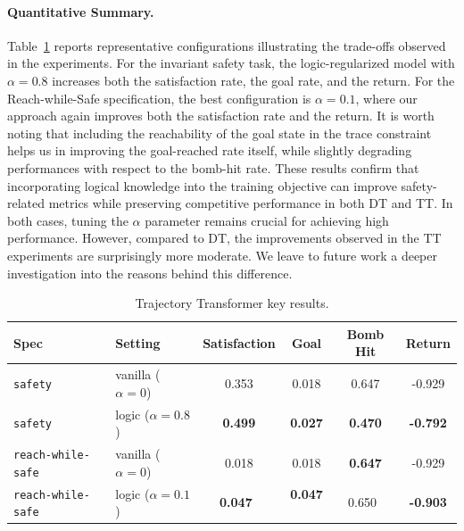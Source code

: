 \paragraph{Quantitative Summary.}
Table~\ref{tab:cb_key_results} reports representative configurations illustrating the trade-offs observed in the experiments.
For the invariant safety task, the logic-regularized model with $\alpha=0.8$ increases both the satisfaction rate, the goal rate, and the return. For the Reach-while-Safe specification, the best configuration is $\alpha=0.1$, where our approach again improves both the satisfaction rate and the return. It is worth noting that including the reachability of the goal state in the trace constraint helps us in improving the goal-reached rate itself, while slightly degrading performances with respect to the bomb-hit rate.
These results confirm that incorporating logical knowledge into the training objective can improve safety-related metrics while preserving competitive performance in both DT and TT. In both cases, tuning the $\alpha$ parameter remains crucial for achieving high performance. However, compared to DT, the improvements observed in the TT experiments are surprisingly more moderate. We leave to future work a deeper investigation into the reasons behind this difference.



\begin{table}[!t]
\centering
\begin{tabular}{l l c c c c}
\toprule
Spec & Setting & Satisfaction & Goal & Bomb Hit & Return \\
\midrule
\texttt{safety} & vanilla ($\alpha=0$) & 0.353 & 0.018 & 0.647 & -0.929 \\
\texttt{safety} & logic ($\alpha=0.8$) & \textbf{0.499} & \textbf{0.027} & \textbf{0.470} & \textbf{-0.792} \\
\midrule
\texttt{reach-while-safe} & vanilla ($\alpha=0$) & 0.018 & 0.018 & \textbf{0.647} & -0.929 \\
\texttt{reach-while-safe} $\,$ & logic ($\alpha=0.1$) $\,$ & \textbf{0.047} $\,$ & \textbf{0.047} $\,$ & 0.650 $\,$ & \textbf{-0.903} \\
\bottomrule
\end{tabular}
\caption{Trajectory Transformer key results.}
\label{tab:cb_key_results}
\end{table}
